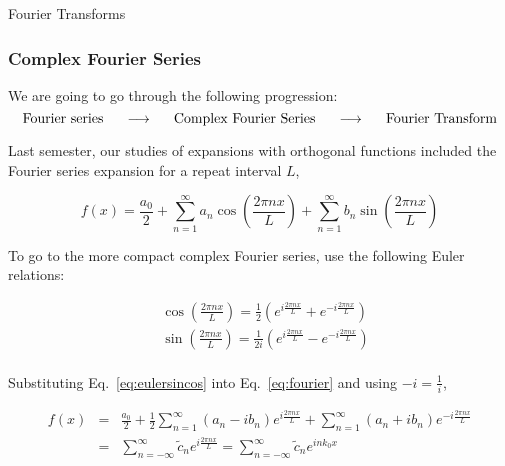 \documentclass[12pt]{article}
\begin{document}
\begin{flushright} {\color{blue} Fourier Transforms} \end{flushright}
\begin{flushleft}

\subsubsection*{\color{myblue} {Complex Fourier Series} }

We are going to go through the following progression:
\[
\text{Fourier series} \hspace{.2in} \longrightarrow \hspace{.2in} \text{Complex Fourier Series} \hspace{.2in} \longrightarrow \hspace{.2in} \text{Fourier Transform}
\]

Last semester, our studies of expansions with orthogonal functions included the Fourier series expansion for a repeat interval $L$, 

\begin{equation}
f(x) = \frac{a_{0}}{2} + \sum_{n=1}^{\infty} a_{n}\cos{\left(\frac{2\pi nx}{L}\right)} + \sum_{n=1}^{\infty} b_{n}\sin{\left(\frac{2\pi n x}{L}\right)}
\label{eq:fourier}
\end{equation}

To go to the more compact complex Fourier series, use the following Euler relations:

\begin{equation}
\begin{aligned}
& \cos{\left(\frac{2\pi nx}{L}\right)} = \frac{1}{2} \left( e^{i\frac{2\pi nx}{L}}+e^{-i\frac{2\pi nx}{L}}\right) \\
& \sin{\left(\frac{2\pi nx}{L}\right)} = \frac{1}{2i} \left( e^{i\frac{2\pi nx}{L}}-e^{-i\frac{2\pi nx}{L}}\right) \\
\label{eq:eulersincos}
\end{aligned}
\end{equation}

Substituting Eq.~\ref{eq:eulersincos} into Eq.~\ref{eq:fourier} and using $-i=\frac{1}{i}$,

\begin{eqnarray}
f(x) & = & \frac{a_{0}}{2} + \frac{1}{2}\sum_{n=1}^{\infty} (a_{n}-ib_{n})e^{i\frac{2\pi nx}{L}} + \sum_{n=1}^{\infty} (a_{n}+ib_{n})e^{-i\frac{2\pi nx}{L}} \nonumber \\
 & = & \sum_{n=-\infty}^{\infty} \tilde{c}_{n}e^{i\frac{2\pi nx}{L}} =\sum_{n=-\infty}^{\infty} \tilde{c}_{n}e^{ink_{0}x}
\label{eq:exp}
\end{eqnarray}


\end{flushleft}
\end{document}
